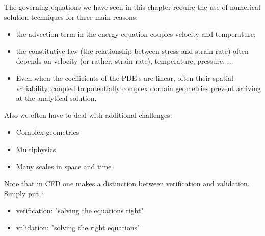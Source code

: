 

The governing equations we have seen in this chapter require the use 
of numerical solution techniques for three main reasons:
\begin{itemize}
\item the advection term in the energy equation couples velocity and temperature;
\item the constitutive law (the relationship between stress and strain rate) 
often depends on velocity (or rather, strain rate), temperature, pressure, ...
\item Even when the coefficients of the PDE's are linear, often their spatial
variability, coupled to potentially complex domain geometries prevent 
arriving at the analytical solution.
\end{itemize}

Also we often have to deal with additional challenges:
\begin{itemize}
\item Complex geometries
\item Multiphysics 
\item Many scales in space and time
\end{itemize}


Note that in CFD one makes a distinction between verification and validation. 
Simply put \cite{roac97}:
\begin{itemize}
\item verification: "solving the equations right"
\item validation: "solving the right equations"
\end{itemize}


